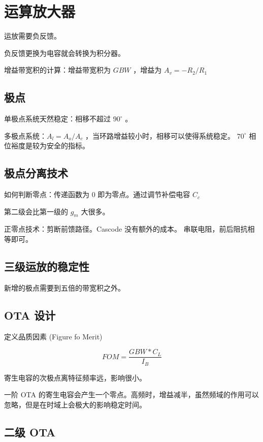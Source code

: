\documentclass[cn,11pt,chinese,black,simple]{../elegantbook}
\begin{document}
\fi 
\def\chapname{05oa}

\chapter{运算放大器}

运放需要负反馈。

负反馈更换为电容就会转换为积分器。

增益带宽积的计算：增益带宽积为 \(GBW\) ，增益为 \(A_v = - R_2/R_1\) 


\section{极点}

单极点系统天然稳定：相移不超过 \(90 ^\circ\) 。
 
多极点系统：\(A_l = A_o / A_c\) ，当环路增益较小时，相移可以使得系统稳定。 \(70^\circ\) 相位裕度是较为安全的指标。  

\section{极点分离技术}

如何判断零点：传递函数为 0 即为零点。通过调节补偿电容 \(C_{c}\) 

第二级会比第一级的 \(g_m\) 大很多。

正零点技术：剪断前馈路径。Cascode 没有额外的成本。 串联电阻，前后阻抗相等即可。

\section{三级运放的稳定性}

新增的极点需要到五倍的带宽积之外。

\section{OTA 设计}

定义品质因素 (Figure fo Merit) 

\[FOM = \frac{GBW * C_L}{I_B}\]

寄生电容的次极点离特征频率远，影响很小。

一阶 OTA 的寄生电容会产生一个零点。高频时，增益减半，虽然频域的作用可以忽略，但是在时域上会极大的影响稳定时间。 

\section{二级 OTA}  
\end{document}
